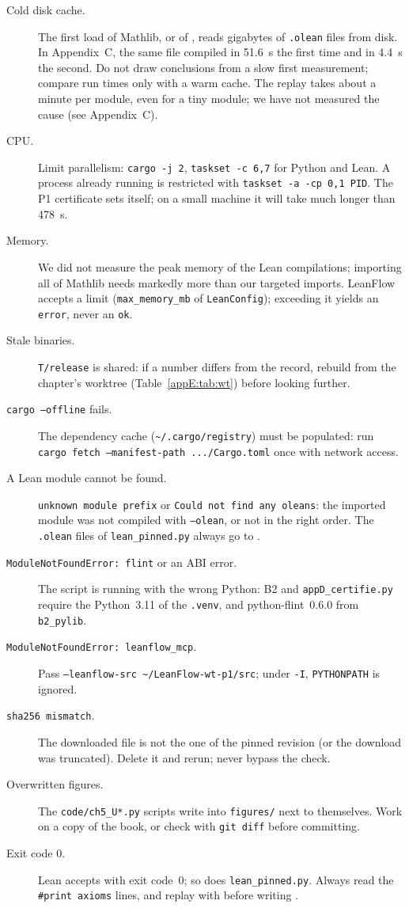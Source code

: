 \begin{description}
\item[Cold disk cache.] The first load of Mathlib, or of , reads gigabytes of \texttt{.olean} files
from disk. In Appendix~C, the same file compiled in 51.6~s the first time and in 4.4~s the second. Do not draw
conclusions from a slow first measurement; compare run times only with a warm cache. The  replay takes
about a minute per module, even for a tiny module; we have not measured the cause (see Appendix~C).
\item[CPU.] Limit parallelism: \texttt{cargo -j 2}, \texttt{taskset -c 6,7} for Python and Lean. A process already
running is restricted with \texttt{taskset -a -cp 0,1 PID}. The P1 certificate sets 
itself; on a small machine it will take much longer than 478~s.
\item[Memory.] We did not measure the peak memory of the Lean compilations; importing all of Mathlib needs markedly
more than our targeted imports. LeanFlow accepts a limit (\texttt{max\_memory\_mb} of \texttt{LeanConfig}); exceeding it
yields an \texttt{error}, never an \texttt{ok}.
\item[Stale binaries.] \texttt{T/release} is shared: if a number differs from the record, rebuild from the chapter's
worktree (Table~\ref{appE:tab:wt}) before looking further.
\item[\texttt{cargo --offline} fails.] The dependency cache (\texttt{\~{}/.cargo/registry}) must be populated: run
\texttt{cargo fetch --manifest-path .../Cargo.toml} once with network access.
\item[A Lean module cannot be found.] \texttt{unknown module prefix} or \texttt{Could not find any oleans}: the imported
module was not compiled with \texttt{--olean}, or not in the right order. The \texttt{.olean} files of
\texttt{lean\_pinned.py} always go to .
\item[\texttt{ModuleNotFoundError: flint} or an ABI error.] The script is running with the wrong Python: B2 and
\texttt{appD\_certifie.py} require the Python~3.11 of the \texttt{.venv}, and python-flint~0.6.0 from \texttt{b2\_pylib}.
\item[\texttt{ModuleNotFoundError: leanflow\_mcp}.] Pass \texttt{--leanflow-src \~{}/LeanFlow-wt-p1/src}; under
\texttt{-I}, \texttt{PYTHONPATH} is ignored.
\item[\texttt{sha256 mismatch}.] The downloaded file is not the one of the pinned revision (or the download was
truncated). Delete it and rerun; never bypass the check.
\item[Overwritten figures.] The \texttt{code/ch5\_U*.py} scripts write into \texttt{figures/} next to themselves. Work
on a copy of the book, or check with \texttt{git diff} before committing.
\item[Exit code 0.] Lean accepts  with exit code~$0$; so does \texttt{lean\_pinned.py}. Always read the
\texttt{\#print axioms} lines, and replay with  before writing \tierA.
\end{description}
